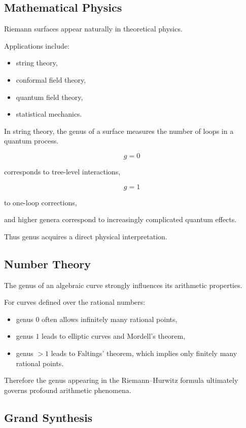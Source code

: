 \documentclass[12pt,a4paper]{article}
\theoremstyle{notespace}
\begin{document}
\subsection{Mathematical Physics}

Riemann surfaces appear naturally in theoretical physics.

Applications include:

\begin{itemize}
	\item string theory,
	\item conformal field theory,
	\item quantum field theory,
	\item statistical mechanics.
\end{itemize}

In string theory, the genus of a surface measures the number of loops in a quantum process.

\[
g=0
\]

corresponds to tree-level interactions,

\[
g=1
\]

to one-loop corrections,

and higher genera correspond to increasingly complicated quantum effects.

Thus genus acquires a direct physical interpretation.

\subsection{Number Theory}

The genus of an algebraic curve strongly influences its arithmetic properties.

For curves defined over the rational numbers:

\begin{itemize}
	\item genus \(0\) often allows infinitely many rational points,
	\item genus \(1\) leads to elliptic curves and Mordell's theorem,
	\item genus \(>1\) leads to Faltings' theorem, which implies only finitely many rational points.
\end{itemize}

Therefore the genus appearing in the Riemann--Hurwitz formula ultimately governs profound arithmetic phenomena.

\subsection{Grand Synthesis}
\end{document}
